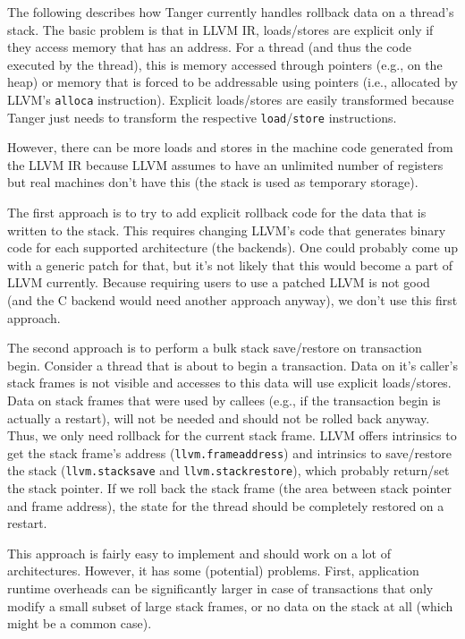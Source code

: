The following describes how Tanger currently handles rollback data on a
thread's stack. The basic problem is that in LLVM IR, loads/stores are
explicit only if they access memory that has an address. For a thread (and
thus the code executed by the thread), this is memory accessed through
pointers (e.g., on the heap) or memory that is forced to be addressable
using pointers (i.e., allocated by LLVM's \texttt{alloca} instruction).
Explicit loads/stores are easily transformed because Tanger just needs to
transform the respective \texttt{load}/\texttt{store} instructions.

However, there can be more loads and stores in the machine code generated from
the LLVM IR because LLVM assumes to have an unlimited number of registers but
real machines don't have this (the stack is used as temporary storage).

The first approach is to try to add explicit rollback code for the data that is
written to the stack. This requires changing LLVM's code that generates binary
code for each supported architecture (the backends). One could probably come up
with a generic patch for that, but it's not likely that this would become a
part of LLVM currently. Because requiring users to use a patched LLVM is not
good (and the C backend would need another approach anyway), we don't use this
first approach.

The second approach is to perform a bulk stack save/restore on transaction
begin. Consider a thread that is about to begin a transaction. Data on it's
caller's stack frames is not visible and accesses to this data will use
explicit loads/stores. Data on stack frames that were used by callees (e.g.,
if the transaction begin is actually a restart), will not be needed and should
not be rolled back anyway. Thus, we only need rollback for the current
stack frame. LLVM offers intrinsics to get the stack frame's address
(\texttt{llvm.frameaddress}) and intrinsics to save/restore the stack
(\texttt{llvm.stacksave} and \texttt{llvm.stackrestore}), which probably
return/set the stack pointer. If we roll back the stack frame (the area
between stack pointer and frame address), the state for the thread should be
completely restored on a restart.

This approach is fairly easy to implement and should work on a lot of
architectures. However, it has some (potential) problems.
First, application runtime overheads can be significantly larger in case
of transactions that only modify a small subset of large stack frames, or no
data on the stack at all (which might be a common case).

